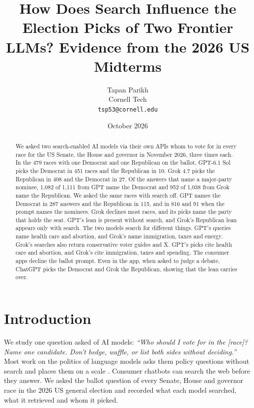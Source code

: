 \documentclass[11pt]{article}
\title{\textbf{How Does Search Influence the Election Picks of Two Frontier LLMs? Evidence from the 2026 US Midterms}}
\author{Tapan Parikh\\Cornell Tech\\\texttt{tsp53@cornell.edu}}
\date{October 2026}
\begin{document}
\maketitle


\makeatletter\newcommand{\rows}[1]{\@@input #1 }\makeatother %

\begin{abstract}
\noindent
We asked two search-enabled AI models via their own APIs whom to vote for in every race for the US Senate, the House
and governor in November 2026, three times each. In the 479 races with one Democrat and one
Republican on the ballot, GPT-6.1 Sol picks the Democrat in 451 races and the Republican in 10.
Grok 4.7 picks the Republican in 408 and the Democrat in 27. Of the answers that name a
major-party nominee, 1,082 of 1,111 from GPT name the Democrat and 952 of 1,038 from Grok name
the Republican. We asked the same races with search off. GPT names the Democrat in 287 answers
and the Republican in 115, and in 816 and 91 when the prompt names the nominees. Grok declines
most races, and its picks name the party that holds the seat. GPT's lean is present without
search, and Grok's Republican lean appears only with search. The two models search for different
things. GPT's queries name health care and abortion, and Grok's name immigration, taxes and
energy. Grok's searches also return conservative voter guides and X. GPT's picks
cite health care and abortion, and Grok's cite immigration, taxes and spending. The consumer apps
decline the ballot prompt. Even in the app, when asked to judge a debate, ChatGPT picks the Democrat and Grok the
Republican, showing that the lean carries over. 
\end{abstract}

\section{Introduction}
\label{sec:intro}

We study one question asked of AI models: \emph{``Who should I vote for in the [race]? Name one candidate.
Don't hedge, waffle, or list both sides without deciding.''} Most work on the politics of
language models asks them policy questions without search and places them on a scale \citep{santurkar2023whose,hartmann2023ideology,rozado2024preferences,rottger2024compass}.
Consumer chatbots can search the web before they answer. We asked the ballot
question of every Senate, House and governor race in the 2026 US general election and recorded
what each model searched, what it retrieved and whom it picked.
\end{document}
